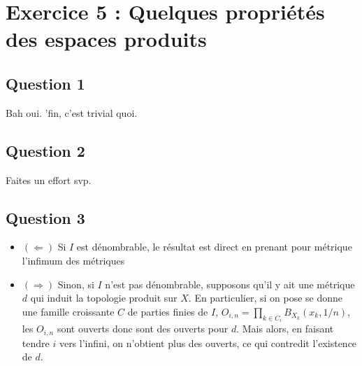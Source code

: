\documentclass{cours}
\begin{document}
\section{Exercice 5 : Quelques propriétés des espaces produits}
    \subsection{Question 1}
            Bah oui. 'fin, c'est trivial quoi. 

    \subsection{Question 2}
            Faites un effort svp.

    \subsection{Question 3}
            \begin{itemize}
                \item $(\Leftarrow)$ Si $I$ est dénombrable, le résultat est direct en prenant pour métrique l'infimum des métriques
                \item $(\Rightarrow)$ Sinon, si $I$ n'est pas dénombrable, supposons qu'il y ait une métrique $d$ qui induit la topologie produit sur $X$. En particulier, si on pose se donne une famille croissante $C$ de parties finies de $I$, $O_{i, n} = \prod_{k \in C_{i}} B_{X_{k}}(x_{k}, 1/n)$, les $O_{i, n}$ sont ouverts donc sont des ouverts pour $d$. Mais alors, en faisant tendre $i$ vers l'infini, on n'obtient plus des ouverts, ce qui contredit l'existence de $d$. 
            \end{itemize}
\end{document}
